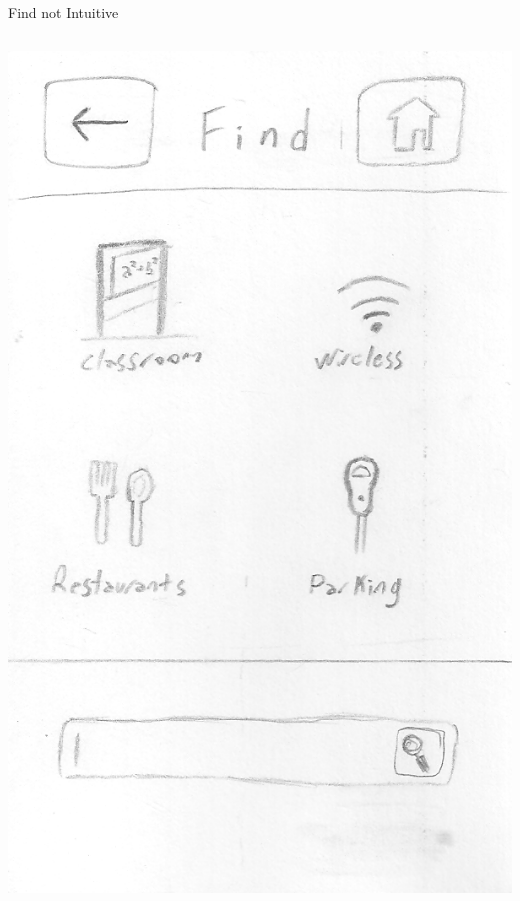 \documentclass{beamer}
\begin{document}
\begin{frame}{Find not Intuitive}
    \begin{columns}[c]
	    \center\includegraphics[height=0.5 \textheight]{hand-drawn/find.png}

\end{columns}
\end{frame}
\end{document}
